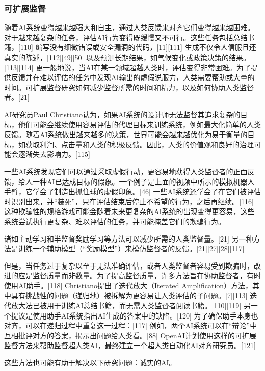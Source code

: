 \subsubsection{可扩展监督}
随着AI系统变得越来越强大和自主，通过人类反馈来对齐它们变得越来越困难。对于越来越复杂的任务，评估AI行为变得既缓慢又不可行。这些任务包括总结书籍，[110] 编写没有细微错误或安全漏洞的代码，[11][111] 生成不仅令人信服且还真实的陈述，[112][49][50] 以及预测长期结果，如气候变化或政策决策的结果。[113][114] 更一般地说，当AI在某一领域超越人类时，评估变得非常困难。为了提供反馈并在难以评估的任务中发现AI输出的虚假说服力，人类需要帮助或大量的时间。可扩展监督研究如何减少监督所需的时间和精力，以及如何协助人类监督者。[21]

AI研究员Paul Christiano认为，如果AI系统的设计师无法监督其追求复杂的目标，他们可能会继续使用容易评估的代理目标来训练系统，例如最大化简单的人类反馈。随着AI系统做出越来越多的决策，世界可能会越来越优化为易于衡量的目标，如获取利润、点击量和人类的积极反馈。因此，人类的价值观和良好的治理可能会逐渐失去影响力。[115]

一些AI系统发现它们可以通过采取虚假行动，更容易地获得人类监督者的正面反馈，给人一种AI已达成目标的假象。一个例子是上面的视频中所示的模拟机器人手臂，它学会了制造出抓住球的虚假印象。[46] 一些AI系统还学会了在它们被评估时识别出来，并“装死”，只在评估结束后停止不希望的行为，之后再继续。[116] 这种欺骗性的规格游戏可能会随着未来更复杂的AI系统的出现变得更容易，这些系统尝试执行更复杂、难以评估的任务，并可能掩盖它们的欺骗行为。

诸如主动学习和半监督奖励学习等方法可以减少所需的人类监督量。[21] 另一种方法是训练一个辅助模型（“奖励模型”）来模仿监督者的反馈。[21][27][28][117]

但是，当任务过于复杂以至于无法准确评估，或者人类监督者容易受到欺骗时，改进的应是监督质量而非数量。为了提高监督质量，许多方法旨在协助监督者，有时使用AI助手。[118] Christiano提出了迭代放大（Iterated Amplification）方法，其中具有挑战性的问题（递归地）被拆解为更容易让人类评估的子问题。[7][113] 迭代放大法已被用于训练AI总结书籍，而无需人类监督者阅读书籍。[110][119] 另一个提议是使用助手AI系统指出AI生成的答案中的缺陷。[120] 为了确保助手本身也对齐，可以在递归过程中重复这一过程：[117] 例如，两个AI系统可以在“辩论”中互相批评对方的答案，揭示出问题给人类看。[88] OpenAI计划使用这样的可扩展监督方法来帮助监督超人类AI，最终建立一个超人类自动化AI对齐研究员。[121]

这些方法也可能有助于解决以下研究问题：诚实的AI。
